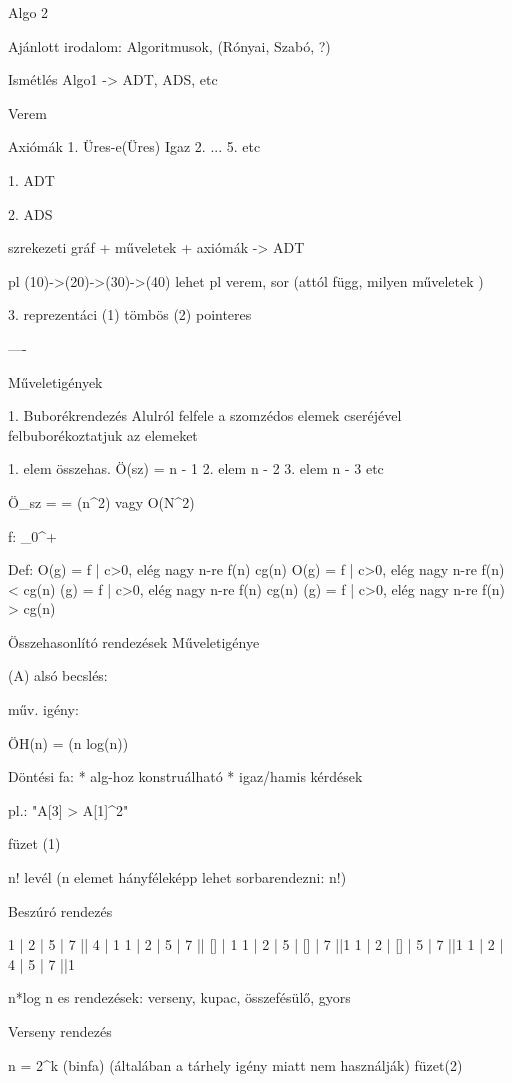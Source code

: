 


Algo 2

Ajánlott irodalom:
Algoritmusok, (Rónyai, Szabó, ?)


Ismétlés
Algo1 -> ADT, ADS, etc

Verem

Axiómák
1. Üres-e(Üres) Igaz
2. ...
5. etc

1. ADT

2. ADS

szrekezeti gráf + { műveletek + axiómák } -> ADT

pl (10)->(20)->(30)->(40) lehet pl verem, sor  (attól függ, milyen műveletek )

3. reprezentáci
(1) tömbös
(2) pointeres

----

Műveletigények

1. Buborékrendezés
Alulról felfele a szomzédos elemek cseréjével felbuborékoztatjuk az elemeket

1. elem összehas. Ö(sz) = n - 1
2. elem n - 2
3. elem n - 3
etc

Ö_{sz} =  = {\Theta}(n^2) vagy O(N^2)

f: {} _0^+

Def:
O(g) = {f | {\exists}c>0, elég nagy n-re f(n) \leq cg(n) }
O(g) = {f | {\exists}c>0, elég nagy n-re f(n) < cg(n) }
{\Omega}(g) = {f | {\exists}c>0, elég nagy n-re f(n) \geq cg(n) }
{\omega}(g) = {f | {\exists}c>0, elég nagy n-re f(n) > cg(n) }

Összehasonlító rendezések Műveletigénye

(A) alsó becslés:

műv. igény:

ÖH(n) = {\Omega}(n \cdot log(n))

Döntési fa:
* \forall alg-hoz konstruálható
* igaz/hamis kérdések

pl.: "A[3] > A[1]^2"

füzet  (1)

n! levél  (n elemet hányféleképp lehet sorbarendezni: n!)

Beszúró rendezés

1 | 2 | 5 | 7 || 4 | 1
1 | 2 | 5 | 7 || [] | 1
1 | 2 | 5 | [] | 7 ||1
1 | 2 | [] | 5 | 7 ||1
1 | 2 | 4 | 5 | 7 ||1

n*log n es rendezések:
verseny, kupac, összefésülő, gyors

Verseny rendezés

n = 2^k
(binfa)
(általában a tárhely igény miatt nem használják)
füzet(2)


